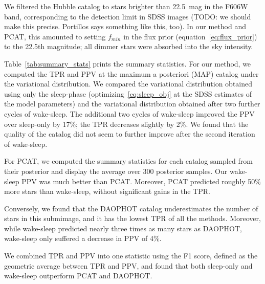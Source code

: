 We filtered the Hubble catalog to stars brighter than 22.5~mag in the F606W band, corresponding to the detection limit in SDSS images  
(TODO: we should make this precise. Portillos says something like this, too). In our method and PCAT, this amounted to setting $f_{min}$ in the flux prior (equation~\ref{eq:flux_prior})
to the 22.5th magnitude; all dimmer stars were absorbed into the sky intensity. 

Table~\ref{tab:summary_stats} prints the summary statistics. For our method, we  computed the TPR and PPV at the maximum a posteriori (MAP) catalog under
the variational distribution. 
We compared the variational distribution obtained using only the sleep-phase (optimizing~\eqref{eq:sleep_obj} at the SDSS estimates of the model parameters)
and the variational distribution obtained after two further cycles of wake-sleep. The additional two cycles of wake-sleep improved the PPV 
over sleep-only by 17\%; the TPR decreases slightly by 2\%. 
We found that the quality of the catalog did not seem to further improve after the second iteration of wake-sleep. 

For PCAT, we computed the summary statistics for each catalog sampled from their posterior and display the average over 300 posterior samples. 
Our wake-sleep PPV was much better than PCAT. 
Moreover, PCAT predicted roughly 50\% more stars than 
wake-sleep, without significant gains in the TPR. 






Conversely, we found that the DAOPHOT catalog underestimates the number of stars in this submimage, and it has the lowest TPR of all the methods. Moreover, while wake-sleep predicted nearly three times as many stars as DAOPHOT, 
wake-sleep only suffered a decrease in PPV of 4\%. 

We combined TPR and PPV into one statistic using the F1 score,
defined as the geometric average between TPR and PPV, and found that both sleep-only and wake-sleep outperform PCAT and DAOPHOT.

